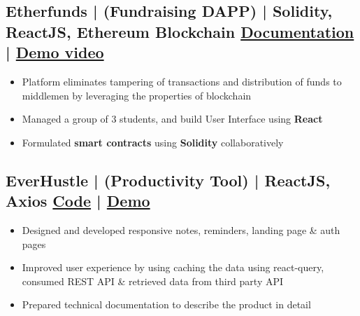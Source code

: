 \documentclass[a4,10pt]{article}
\newenvironment{zitemize}{
\begin{itemize}\itemsep0pt \parskip0pt \parsep1pt}
{\end{itemize}\vspace{-0.5cm}}
\begin{document}

\subsection*{Etherfunds {\normalsize\normalfont | (Fundraising DAPP) | Solidity, ReactJS, Ethereum Blockchain } 
\hfill {\href{https://developersleague.github.io/Etherfunds/}{Documentation} } | {\href{https://youtu.be/UXFDYHBjoxo}{Demo video} }
} 
    \begin{zitemize}
        \item Platform eliminates tampering of transactions and distribution of funds to middlemen by leveraging the properties of blockchain
        \item Managed a group of 3 students, and build User Interface using \textbf{React}
        \item Formulated \textbf{smart contracts} using \textbf{Solidity} collaboratively
    \end{zitemize}

\vspace{0.1cm}

\subsection*{EverHustle {\normalsize\normalfont | (Productivity Tool) | ReactJS, Axios} \hfill {\href{https://github.com/DevelopersLeague/EverHustle-FrontEnd}{Code} }| {\href{https://everhustle.netlify.app/}{Demo} }} 
    \begin{zitemize}
        
        \item Designed and developed responsive notes, reminders, landing page \& auth pages
        \item Improved user experience by using caching the data using react-query, consumed REST API \& retrieved data
        from third party API
        \item Prepared technical documentation to describe the product in detail
    \end{zitemize}

\vspace{0.1cm}
\end{document}
